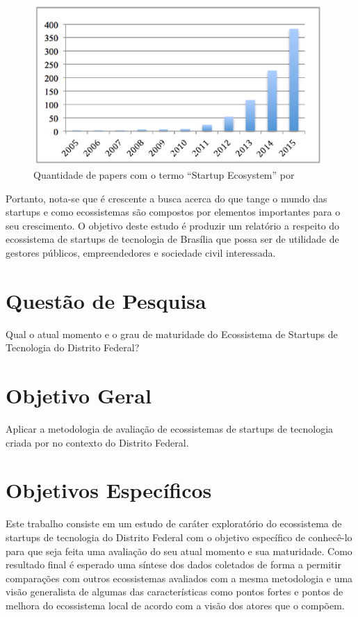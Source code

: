 \
\begin{figure}[!htb]
	\centering
	\includegraphics[width=11cm,angle=0]{figuras/papers_about_startup_ecosystems}
	\caption{Quantidade de papers com o termo ``Startup Ecosystem'' por }
	\label{figure:papers_about_startup_ecosystems}
\end{figure}

Portanto, nota-se que é crescente a busca acerca do que tange o mundo das startups e como ecossistemas são compostos por elementos importantes para o seu crescimento. O objetivo deste estudo é produzir um relatório a respeito do ecossistema de startups de tecnologia de Brasília que possa ser de utilidade de gestores públicos, empreendedores e sociedade civil interessada.

\section{Questão de Pesquisa}
\label{section:questao_de_pesquisa}

Qual o atual momento e o grau de maturidade do Ecossistema de Startups de Tecnologia do Distrito Federal?

\section{Objetivo Geral}
\label{section:objetivo_geral}

Aplicar a metodologia de avaliação de ecossistemas de startups de tecnologia criada por  no contexto do Distrito Federal.

\section{Objetivos Específicos}
\label{section:objetivos_especificos}

Este trabalho consiste em um estudo de caráter exploratório do ecossistema de startups de tecnologia do Distrito Federal com o objetivo específico de conhecê-lo para que seja feita uma avaliação do seu atual momento e sua maturidade. Como resultado final é esperado uma síntese dos dados coletados de forma a permitir comparações com outros ecossistemas avaliados com a mesma metodologia e uma visão generalista de algumas das características como pontos fortes e pontos de melhora do ecossistema local de acordo com a visão dos atores que o compõem. 

